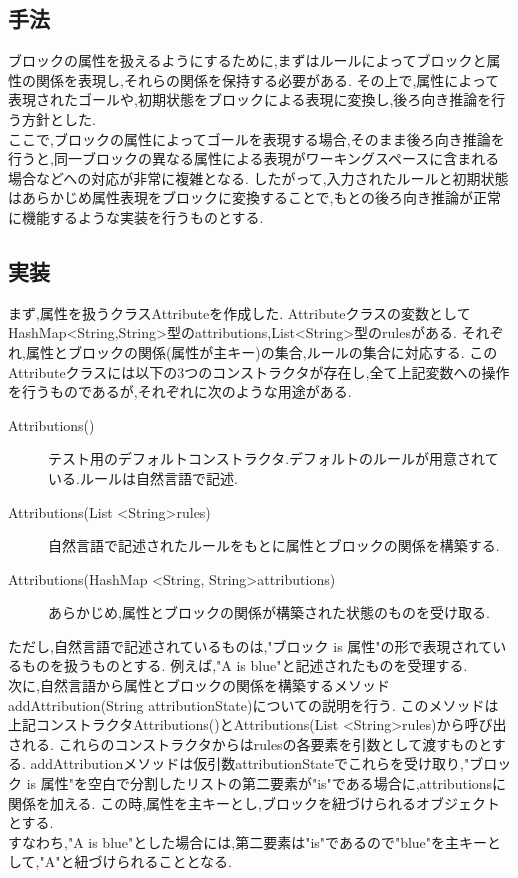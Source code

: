 \documentclass[uplatex,12pt]{jsarticle}
\begin{document}
\subsection{手法}
ブロックの属性を扱えるようにするために,まずはルールによってブロックと属性の関係を表現し,それらの関係を保持する必要がある.
その上で,属性によって表現されたゴールや,初期状態をブロックによる表現に変換し,後ろ向き推論を行う方針とした. \\
ここで,ブロックの属性によってゴールを表現する場合,そのまま後ろ向き推論を行うと,同一ブロックの異なる属性による表現がワーキングスペースに含まれる場合などへの対応が非常に複雑となる.
したがって,入力されたルールと初期状態はあらかじめ属性表現をブロックに変換することで,もとの後ろ向き推論が正常に機能するような実装を行うものとする.

\subsection{実装}
まず,属性を扱うクラスAttributeを作成した.
Attributeクラスの変数としてHashMap<String,String>型のattributions,List<String>型のrulesがある.
それぞれ,属性とブロックの関係(属性が主キー)の集合,ルールの集合に対応する.
このAttributeクラスには以下の3つのコンストラクタが存在し,全て上記変数への操作を行うものであるが,それぞれに次のような用途がある.

\begin{description}
    \item[Attributions()] テスト用のデフォルトコンストラクタ.デフォルトのルールが用意されている.ルールは自然言語で記述.
    \item[Attributions(List \textless String\textgreater rules)] 自然言語で記述されたルールをもとに属性とブロックの関係を構築する.
    \item[Attributions(HashMap \textless String, String\textgreater attributions)] あらかじめ,属性とブロックの関係が構築された状態のものを受け取る.
\end{description}
ただし,自然言語で記述されているものは,"ブロック is 属性"の形で表現されているものを扱うものとする.
例えば,"A is blue"と記述されたものを受理する. \\

次に,自然言語から属性とブロックの関係を構築するメソッドaddAttribution(String attributionState)についての説明を行う.
このメソッドは上記コンストラクタAttributions()とAttributions(List \textless String\textgreater rules)から呼び出される.
これらのコンストラクタからはrulesの各要素を引数として渡すものとする.
addAttributionメソッドは仮引数attributionStateでこれらを受け取り,"ブロック is 属性"を空白で分割したリストの第二要素が"is"である場合に,attributionsに関係を加える.
この時,属性を主キーとし,ブロックを紐づけられるオブジェクトとする. \\
すなわち,"A is blue"とした場合には,第二要素は"is"であるので"blue"を主キーとして,"A"と紐づけられることとなる. \\
\end{document}
